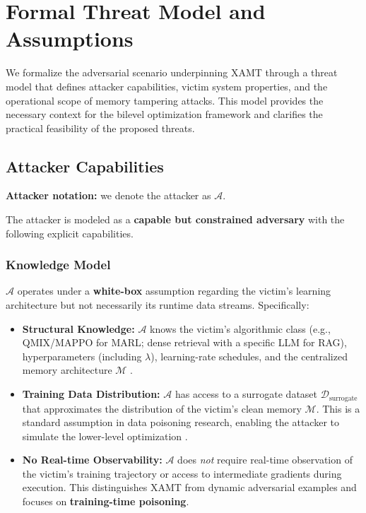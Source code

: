\documentclass[conference]{IEEEtran}
\begin{document}
\section{Formal Threat Model and Assumptions}
\label{sec:threat_model}

We formalize the adversarial scenario underpinning XAMT through a threat model that defines attacker capabilities, victim system properties, and the operational scope of memory tampering attacks. This model provides the necessary context for the bilevel optimization framework and clarifies the practical feasibility of the proposed threats.

\subsection{Attacker Capabilities}
\textbf{Attacker notation:} we denote the attacker as $\mathcal{A}$.

The attacker is modeled as a \textbf{capable but constrained adversary} with the following explicit capabilities.

\subsubsection{Knowledge Model}
$\mathcal{A}$ operates under a \textbf{white-box} assumption regarding the victim's learning architecture but not necessarily its runtime data streams. Specifically:

\begin{itemize}
\item \textbf{Structural Knowledge:} $\mathcal{A}$ knows the victim's algorithmic class (e.g., QMIX/MAPPO for MARL; dense retrieval with a specific LLM for RAG), hyperparameters (including $\lambda$), learning-rate schedules, and the centralized memory architecture $\mathcal{M}$ \cite{Ref12, Ref14}.
\item \textbf{Training Data Distribution:} $\mathcal{A}$ has access to a surrogate dataset $\mathcal{D}_{\text{surrogate}}$ that approximates the distribution of the victim's clean memory $\mathcal{M}$. This is a standard assumption in data poisoning research, enabling the attacker to simulate the lower-level optimization \cite{Ref18, Ref19}.
\item \textbf{No Real-time Observability:} $\mathcal{A}$ does \textit{not} require real-time observation of the victim's training trajectory or access to intermediate gradients during execution. This distinguishes XAMT from dynamic adversarial examples and focuses on \textbf{training-time poisoning}.
\end{itemize}
\end{document}
